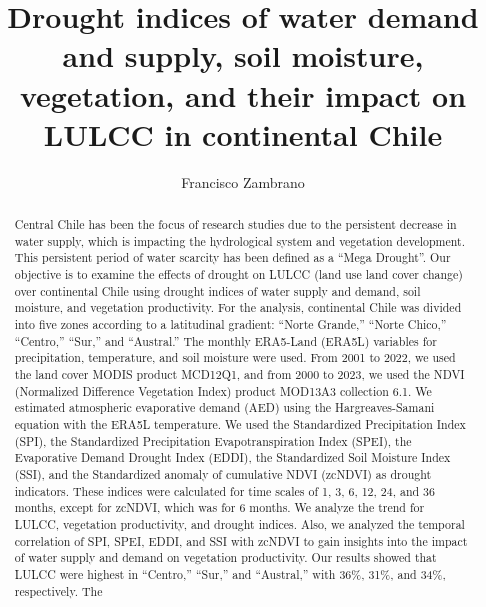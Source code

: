 \documentclass[
  authoryear,
  preprint,
  3p,
  onecolumn]{elsarticle}
\begin{document}
\begin{frontmatter}
\title{Drought indices of water demand and supply, soil moisture,
vegetation, and their impact on LULCC in continental Chile}
\author[1]{Francisco Zambrano%
%
}


        
\begin{abstract}
Central Chile has been the focus of research studies due to the
persistent decrease in water supply, which is impacting the hydrological
system and vegetation development. This persistent period of water
scarcity has been defined as a ``Mega Drought''. Our objective is to
examine the effects of drought on LULCC (land use land cover change)
over continental Chile using drought indices of water supply and demand,
soil moisture, and vegetation productivity. For the analysis,
continental Chile was divided into five zones according to a latitudinal
gradient: ``Norte Grande,'' ``Norte Chico,'' ``Centro,'' ``Sur,'' and
``Austral.'' The monthly ERA5-Land (ERA5L) variables for precipitation,
temperature, and soil moisture were used. From 2001 to 2022, we used the
land cover MODIS product MCD12Q1, and from 2000 to 2023, we used the
NDVI (Normalized Difference Vegetation Index) product MOD13A3 collection
6.1. We estimated atmospheric evaporative demand (AED) using the
Hargreaves-Samani equation with the ERA5L temperature. We used the
Standardized Precipitation Index (SPI), the Standardized Precipitation
Evapotranspiration Index (SPEI), the Evaporative Demand Drought Index
(EDDI), the Standardized Soil Moisture Index (SSI), and the Standardized
anomaly of cumulative NDVI (zcNDVI) as drought indicators. These indices
were calculated for time scales of 1, 3, 6, 12, 24, and 36 months,
except for zcNDVI, which was for 6 months. We analyze the trend for
LULCC, vegetation productivity, and drought indices. Also, we analyzed
the temporal correlation of SPI, SPEI, EDDI, and SSI with zcNDVI to gain
insights into the impact of water supply and demand on vegetation
productivity. Our results showed that LULCC were highest in ``Centro,''
``Sur,'' and ``Austral,'' with 36\%, 31\%, and 34\%, respectively. The

\end{abstract}
\end{frontmatter}
\end{document}

